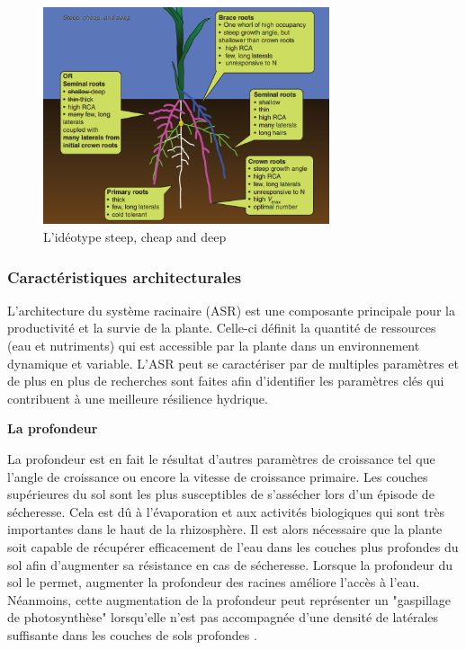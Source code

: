 \begin{figure}[ht]
\centering
\includegraphics[width=0.75\textwidth]{Image/steep, cheap and deep.png}
\caption{L'idéotype steep, cheap and deep \citep{lynch_steep_2013}}
\label{fig:steep, cheap and deep}
\end{figure}

\subsubsection{Caractéristiques architecturales}

L'architecture du système racinaire (ASR) est une composante principale pour la productivité et la survie de la plante.
Celle-ci définit la quantité de ressources (eau et nutriments) qui est accessible par la plante dans un environnement dynamique et variable. 
L'ASR peut se caractériser par de multiples paramètres et de plus en plus de recherches sont faites afin d'identifier les paramètres clés qui contribuent à une meilleure résilience hydrique.
\newline

\noindent \textbf{La profondeur}

La profondeur est en fait le résultat d'autres paramètres de croissance tel que l'angle de croissance ou encore la vitesse de croissance primaire.
Les couches supérieures du sol sont les plus susceptibles de s'assécher lors d'un épisode de sécheresse. 
Cela est dû à l'évaporation et aux activités biologiques qui sont très importantes dans le haut de la rhizosphère.
Il est alors nécessaire que la plante soit capable de récupérer efficacement de l'eau dans les couches plus profondes du sol afin d'augmenter sa résistance en cas de sécheresse.
Lorsque la profondeur du sol le permet, augmenter la profondeur des racines améliore l'accès à l'eau.
Néanmoins, cette augmentation de la profondeur peut représenter un "gaspillage de photosynthèse" lorsqu'elle n'est pas accompagnée d'une densité de latérales suffisante dans les couches de sols profondes \citep{tardieu_any_2012}.
\newline

